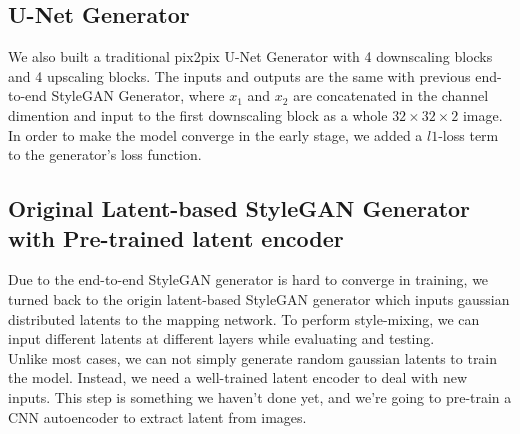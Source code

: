 \documentclass[letterpaper]{article}
\begin{document}
\subsection{U-Net Generator}
We also built a traditional pix2pix U-Net Generator with 4 downscaling blocks and 4 upscaling blocks. The inputs and outputs are the same with previous end-to-end StyleGAN Generator, where $x_1$ and $x_2$ are concatenated in the channel dimention and input to the first downscaling block as a whole $32 \times 32 \times 2$ image.
\\
In order to make the model converge in the early stage, we added a $l1$-loss term to the generator's loss function.

\subsection{Original Latent-based StyleGAN Generator with Pre-trained latent encoder}
Due to the end-to-end StyleGAN generator is hard to converge in training, we turned back to the origin latent-based StyleGAN generator which inputs gaussian distributed latents to the mapping network. To perform style-mixing, we can input different latents at different layers while evaluating and testing.
\\
Unlike most cases, we can not simply generate random gaussian latents to train the model. Instead, we need a well-trained latent encoder to deal with new inputs.
This step is something we haven't done yet, and we're going to pre-train a CNN autoencoder to extract latent from images.
\end{document}
